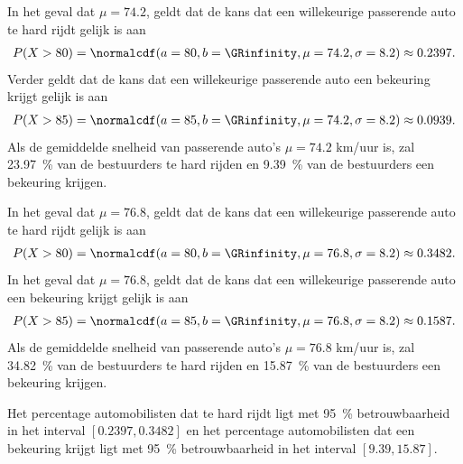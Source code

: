 \begin{enumerate}[label=(\alph*)]
{        In het geval dat $\mu = 74.2$, geldt dat de kans dat een willekeurige passerende auto te hard rijdt gelijk is aan 
        \begin{align*}
            P(X > 80) = \normalcdf(a=80, b=\GRinfinity, \mu=74.2, \sigma=8.2) \approx 0.2397.
        \end{align*}
        Verder geldt dat de kans dat een willekeurige passerende auto een bekeuring krijgt gelijk is aan 
        \begin{align*}
            P(X > 85) = \normalcdf(a=85, b=\GRinfinity, \mu=74.2, \sigma=8.2) \approx 0.0939.
        \end{align*}
        Als de gemiddelde snelheid van passerende auto's $\mu=74.2$ km/uur is, zal \SI{23.97}{\percent} van de bestuurders te hard rijden en \SI{9.39}{\percent} van de bestuurders een bekeuring krijgen.

        In het geval dat $\mu = 76.8$, geldt dat de kans dat een willekeurige passerende auto te hard rijdt gelijk is aan 
        \begin{align*}
            P(X > 80) = \normalcdf(a=80, b=\GRinfinity, \mu=76.8, \sigma=8.2) \approx 0.3482.
        \end{align*}
        In het geval dat $\mu = 76.8$, geldt dat de kans dat een willekeurige passerende auto een bekeuring krijgt gelijk is aan 
        \begin{align*}
            P(X > 85) = \normalcdf(a=85, b=\GRinfinity, \mu=76.8, \sigma=8.2) \approx 0.1587.
        \end{align*}
        Als de gemiddelde snelheid van passerende auto's $\mu=76.8$ km/uur is, zal \SI{34.82}{\percent} van de bestuurders te hard rijden en \SI{15.87}{\percent} van de bestuurders een bekeuring krijgen.

        Het percentage automobilisten dat te hard rijdt ligt met \SI{95}{\percent} betrouwbaarheid in het interval
        $[0.2397, 0.3482]$ en het percentage automobilisten dat een bekeuring krijgt ligt met \SI{95}{\percent} betrouwbaarheid in het interval $[9.39, 15.87]$.
    }
\end{enumerate}
